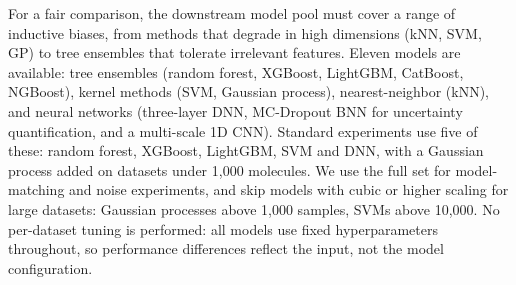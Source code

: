 
For a fair comparison, the downstream model pool must cover a range of inductive biases, from methods that degrade in high dimensions (kNN, SVM, GP) to tree ensembles that tolerate irrelevant features. Eleven models are available: tree ensembles (random forest, XGBoost, LightGBM, CatBoost, NGBoost), kernel methods (SVM, Gaussian process), nearest-neighbor (kNN), and neural networks (three-layer DNN, MC-Dropout BNN for uncertainty quantification, and a multi-scale 1D CNN). Standard experiments use five of these: random forest, XGBoost, LightGBM, SVM and DNN, with a Gaussian process added on datasets under 1,000 molecules. We use the full set for model-matching and noise experiments, and skip models with cubic or higher scaling for large datasets: Gaussian processes above 1,000 samples, SVMs above 10,000. No per-dataset tuning is performed: all models use fixed hyperparameters throughout, so performance differences reflect the input, not the model configuration.




